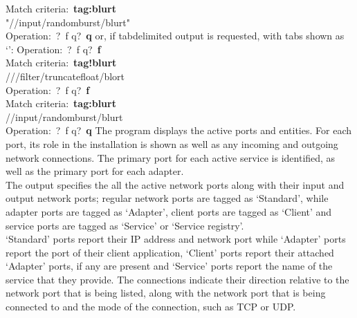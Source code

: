 Match criteria:\ \textbf{tag:blurt}\\
\openSq{} "/\serviceName/input/randomburst/blurt" \closeSq\\
Operation:\ \openSq{}?\ f q\closeSq{}?\ \textbf{q}
\outputEnd{}
or, if tab\longDash{}delimited output is requested, with tabs shown as `\tabSymbol':
\outputBegin{}
Operation:\ \openSq{}?\ f q\closeSq{}?\ \textbf{f}\\
Match criteria:\ \textbf{tag!blurt}\\
/\dollarService\pseudotab/\serviceName/filter/truncatefloat\pseudotab/blort\\
Operation:\ \openSq{}?\ f q\closeSq{}?\ \textbf{f}\\
Match criteria:\ \textbf{tag:blurt}\\
/\serviceName/input/randomburst/blurt\\
Operation:\ \openSq{}?\ f q\closeSq{}?\ \textbf{q}
\outputEnd{}
The program  displays the active \yarp{} ports and \mplusm{}
entities.
For each \yarp{} port, its role in the \mplusm{} installation is shown as well as any
incoming and outgoing \yarp{} network connections.
The primary port for each active service is identified, as well as the primary port for
each adapter.\\

The output specifies the all the active \yarp{} network ports along with their input and
output \yarp{} network ports; regular \yarp{} network ports are tagged as `Standard',
while \mplusm{} adapter ports are tagged as `Adapter', \mplusm{} client ports are tagged
as `Client' and \mplusm{} service ports are tagged as `Service' or `Service registry'.\\

`Standard' ports report their IP address and network port while `Adapter' ports report
the \mplusm{} port of their client application, `Client' ports report their attached
`Adapter' ports, if any are present and `Service' ports report the name of the \mplusm{}
service that they provide.
The connections indicate their direction relative to the \yarp{} network port that is
being listed, along with the \yarp{} network port that is being connected to and the mode
of the connection, such as TCP or UDP.\\

